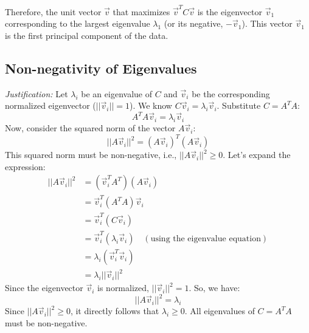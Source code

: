 \documentclass{report}
\begin{document}
Therefore, the unit vector $\vec{v}$ that maximizes $\vec{v}^T C \vec{v}$ is the eigenvector $\vec{v}_1$ corresponding to the largest eigenvalue $\lambda_1$ (or its negative, $-\vec{v}_1$). This vector $\vec{v}_1$ is the first principal component of the data.

\subsection{Non-negativity of Eigenvalues}


\textit{Justification:}
Let $\lambda_i$ be an eigenvalue of $C$ and $\vec{v}_i$ be the corresponding normalized eigenvector ($||\vec{v}_i||=1$).
We know $C \vec{v}_i = \lambda_i \vec{v}_i$.
Substitute $C = A^T A$:
\[
	A^T A \vec{v}_i = \lambda_i \vec{v}_i
\]
Now, consider the squared norm of the vector $A\vec{v}_i$:
\[
	||A\vec{v}_i||^2 = (A\vec{v}_i)^T (A\vec{v}_i)
\]
This squared norm must be non-negative, i.e., $||A\vec{v}_i||^2 \ge 0$.
Let's expand the expression:
\begin{align*} ||A\vec{v}_i||^2 &= (\vec{v}_i^T A^T) (A\vec{v}_i) \\ &= \vec{v}_i^T (A^T A) \vec{v}_i \\ &= \vec{v}_i^T (C \vec{v}_i) \\ &= \vec{v}_i^T (\lambda_i \vec{v}_i) \quad (\text{using the eigenvalue equation}) \\ &= \lambda_i (\vec{v}_i^T \vec{v}_i) \\ &= \lambda_i ||\vec{v}_i||^2 \end{align*}
Since the eigenvector $\vec{v}_i$ is normalized, $||\vec{v}_i||^2 = 1$.
So, we have:
\[
	||A\vec{v}_i||^2 = \lambda_i
\]
Since $||A\vec{v}_i||^2 \ge 0$, it directly follows that $\lambda_i \ge 0$.
All eigenvalues of $C = A^T A$ must be non-negative.

\begin{center}
\end{center}
\end{document}
